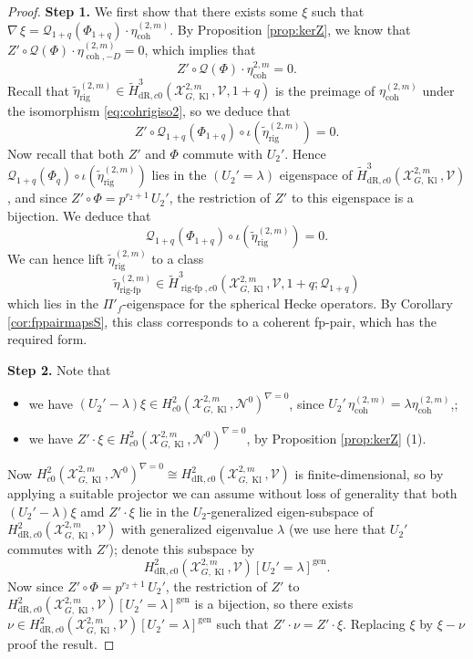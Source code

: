 \documentclass[10pt,a4paper]{amsart}
\DeclareMathOperator{\Kl}{Kl}
\DeclareMathOperator{\coh}{coh}
\DeclareMathOperator{\gen}{gen}
\DeclareMathOperator{\rigfp}{rig-fp}
\newcommand{\cN}{\mathcal{N}}
\newcommand{\cQ}{\mathcal{Q}}
\newcommand{\cV}{\mathcal{V}}
\newcommand{\cX}{\mathcal{X}}
\newcommand{\dR}{\mathrm{dR}}
\newcommand{\rig}{\mathrm{rig}}
\newcommand{\wH}{\widetilde{H}}
\begin{document}
\begin{proof}

 \textbf{Step 1.}  We first show that there exists some $\xi$ such that $\nabla\,\xi=\cQ_{1+q}(\Phi_{1+q})\cdot \eta_{\coh}^{(2,m)}$.  By Proposition \ref{prop:kerZ}, we know that $Z'\circ \cQ(\Phi)\cdot \eta_{\coh,-D}^{(2,m)}=0$, which implies that
 \[ Z'\circ \cQ(\Phi)\cdot \eta_{\coh}^{2,m}=0. \]
 Recall that $\tilde\eta^{(2,m)}_{\rig}\in \wH^3_{\dR,c0}(\cX^{2,m}_{G,\Kl},\cV,1+q)$ is the preimage of $\eta_{\coh}^{(2,m)}$ under the isomorphism \eqref{eq:cohrigiso2}, so we deduce that
 \[ Z'\circ \cQ_{1+q}(\Phi_{1+q})\circ\iota ( \tilde\eta^{(2,m)}_{\rig})=0.\]
 Now recall that both $Z'$ and $\Phi$ commute with $U_2'$. Hence $\cQ_{1+q}(\Phi_{q})\circ\iota(\tilde\eta^{(2,m)}_{\rig})$ lies in the $(U_2'=\lambda)$ eigenspace of $ \wH^3_{\dR,c0}(\cX^{2,m}_{G,\Kl},\cV)$, and since $Z'\circ\Phi=p^{r_2+1}\, U_2'$, the restriction of $Z'$ to this eigenspace is a bijection. We deduce that
 \[  \cQ_{1+q}(\Phi_{1+q}) \circ \iota (\tilde\eta^{(2,m)}_{\rig})=0.\]
 We can hence lift $\tilde\eta^{(2,m)}_{\rig}$ to a class
 \[ \tilde\eta^{(2,m)}_{\rigfp} \in \wH^3_{\rigfp,c0}(\cX^{2,m}_{G,\Kl},\cV,1+q;\cQ_{1+q})   \]
 which lies in the $\Pi'_f$-eigenspace for the spherical Hecke operators. By Corollary \ref{cor:fppairmapsS}, this class corresponds to a coherent fp-pair, which has the required form.
 \vspace{1ex}

 \textbf{Step 2.} Note that
 \begin{itemize}
  \item we have  $(U_2'-\lambda)\xi\in H^2_{c0}(\cX^{2,m}_{G,\Kl},\cN^0)^{\nabla=0}$, since $U_2'\,\eta_{\coh}^{(2,m)}=\lambda\eta_{\coh}^{(2,m)}$,;
  \item we have $Z'\cdot\xi\in H^2_{c0}(\cX^{2,m}_{G,\Kl},\cN^0)^{\nabla=0}$, by Proposition \ref{prop:kerZ} (1).
 \end{itemize}
 Now $H^2_{c0}(\cX^{2,m}_{G,\Kl},\cN^0)^{\nabla=0}\cong H^2_{\dR,c0}(\cX^{2,m}_{G,\Kl},\cV)$ is finite-dimensional, so by applying a suitable projector we can assume without loss of generality that both $(U_2'-\lambda)\xi$ amd $Z'\cdot \xi$ lie in the $U_2$-generalized eigen-subspace of $H^2_{\dR,c0}(\cX^{2,m}_{G,\Kl},\cV)$ with generalized eigenvalue $\lambda$ (we use here that $U_2'$ commutes with $Z'$); denote this subspace by
 \[ H^2_{\dR,c0}(\cX^{2,m}_{G,\Kl},\cV)[U_2'=\lambda]^{\gen}.\]
 Now since $Z'\circ\Phi=p^{r_2+1}\, U_2'$, the restriction of $Z'$ to $H^2_{\dR,c0}(\cX^{2,m}_{G,\Kl},\cV)[U_2'=\lambda]^{\gen}$ is a bijection, so there exists $\nu\in H^2_{\dR,c0}(\cX^{2,m}_{G,\Kl},\cV)[U_2'=\lambda]^{\gen}$ such that $Z'\cdot \nu=Z'\cdot \xi$. Replacing $\xi$ by $\xi-\nu$ proof the result.
\end{proof}
\end{document}
